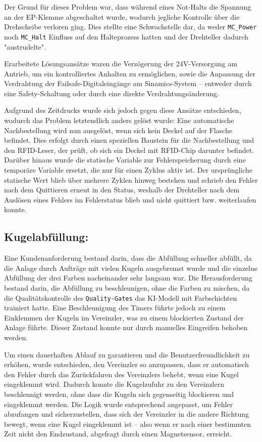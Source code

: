 Der Grund für dieses Problem war, dass während eines Not-Halts die Spannung an der EP-Klemme abgeschaltet wurde, wodurch jegliche Kontrolle über die Drehscheibe verloren ging. Dies stellte eine Schwachstelle dar, da weder \texttt{MC\_Power} noch \texttt{MC\_Halt} Einfluss auf den Halteprozess hatten und der Drehteller dadurch "austrudelte".  

Erarbeitete Lösungsansätze waren die Verzögerung der 24V-Versorgung am Antrieb, um ein kontrolliertes Anhalten zu ermöglichen, sowie die Anpassung der Verdrahtung der Failsafe-Digitaleingänge am Sinamics-System – entweder durch eine Safety-Schaltung oder durch eine direkte Verdrahtungsänderung.  

Aufgrund des Zeitdrucks wurde sich jedoch gegen diese Ansätze entschieden, wodurch das Problem letztendlich anders gelöst wurde: Eine automatische Nachbestellung wird nun ausgelöst, wenn sich kein Deckel auf der Flasche befindet. Dies erfolgt durch einen speziellen Baustein für die Nachbestellung und den RFID-Leser, der prüft, ob sich ein Deckel mit RFID-Chip darunter befindet. Darüber hinaus wurde die statische Variable zur Fehlerspeicherung durch eine temporäre Variable ersetzt, die nur für einen Zyklus aktiv ist. Der ursprüngliche statische Wert blieb über mehrere Zyklen hinweg bestehen und schrieb den Fehler nach dem Quittieren erneut in den Status, weshalb der Drehteller nach dem Auslösen eines Fehlers im Fehlerstatus blieb und nicht quittiert bzw. weiterlaufen konnte.
\subsection{Kugelabfüllung:} 
Eine Kundenanforderung bestand darin, dass die Abfüllung schneller abfüllt, da die Anlage durch Aufträge mit vielen Kugeln ausgebremst wurde und die einzelne Abfüllung der drei Farben nacheinander sehr langsam war. Die Herausforderung bestand darin, die Abfüllung zu beschleunigen, ohne die Farben zu mischen, da die Qualitätskontrolle des \texttt{Quality-Gates} das KI-Modell mit Farbschichten trainiert hatte. Eine Beschleunigung des Timers führte jedoch zu einem Einklemmen der Kugeln im Vereinzler, was zu einem blockierten Zustand der Anlage führte. Dieser Zustand konnte nur durch manuelles Eingreifen behoben werden.  

Um einen dauerhaften Ablauf zu garantieren und die Benutzerfreundlichkeit zu erhöhen, wurde entschieden, den Vereinzler so anzupassen, dass er automatisch den Fehler durch das Zurückfahren des Vereinzlers behebt, wenn eine Kugel eingeklemmt wird. Dadurch konnte die Kugelzufuhr zu den Vereinzlern beschleunigt werden, ohne dass die Kugeln sich gegenseitig blockieren und eingeklemmt werden. Die Logik wurde entsprechend angepasst, um Fehler abzufangen und sicherzustellen, dass sich der Vereinzler in die andere Richtung bewegt, wenn eine Kugel eingeklemmt ist – also wenn er nach einer bestimmten Zeit nicht den Endzustand, abgefragt durch einen Magnetsensor, erreicht.  

